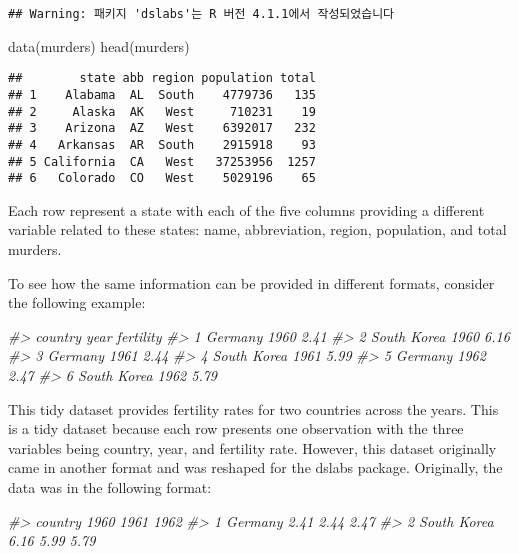 \documentclass[
]{article}
\newenvironment{Shaded}{\begin{snugshade}}{\end{snugshade}}
\newcommand{\CommentTok}[1]{\textcolor[rgb]{0.56,0.35,0.01}{\textit{#1}}}
\newcommand{\FunctionTok}[1]{\textcolor[rgb]{0.00,0.00,0.00}{#1}}
\newcommand{\NormalTok}[1]{#1}
\begin{document}
\begin{verbatim}
## Warning: 패키지 'dslabs'는 R 버전 4.1.1에서 작성되었습니다
\end{verbatim}

\begin{Shaded}
\begin{Highlighting}[]
\FunctionTok{data}\NormalTok{(murders)}
\FunctionTok{head}\NormalTok{(murders)}
\end{Highlighting}
\end{Shaded}

\begin{verbatim}
##        state abb region population total
## 1    Alabama  AL  South    4779736   135
## 2     Alaska  AK   West     710231    19
## 3    Arizona  AZ   West    6392017   232
## 4   Arkansas  AR  South    2915918    93
## 5 California  CA   West   37253956  1257
## 6   Colorado  CO   West    5029196    65
\end{verbatim}

Each row represent a state with each of the five columns providing a
different variable related to these states: name, abbreviation, region,
population, and total murders.

To see how the same information can be provided in different formats,
consider the following example:

\begin{Shaded}
\begin{Highlighting}[]
\CommentTok{\#\textgreater{}       country year fertility}
\CommentTok{\#\textgreater{} 1     Germany 1960      2.41}
\CommentTok{\#\textgreater{} 2 South Korea 1960      6.16}
\CommentTok{\#\textgreater{} 3     Germany 1961      2.44}
\CommentTok{\#\textgreater{} 4 South Korea 1961      5.99}
\CommentTok{\#\textgreater{} 5     Germany 1962      2.47}
\CommentTok{\#\textgreater{} 6 South Korea 1962      5.79}
\end{Highlighting}
\end{Shaded}

This tidy dataset provides fertility rates for two countries across the
years. This is a tidy dataset because each row presents one observation
with the three variables being country, year, and fertility rate.
However, this dataset originally came in another format and was reshaped
for the dslabs package. Originally, the data was in the following
format:

\begin{Shaded}
\begin{Highlighting}[]
\CommentTok{\#\textgreater{}       country 1960 1961 1962}
\CommentTok{\#\textgreater{} 1     Germany 2.41 2.44 2.47}
\CommentTok{\#\textgreater{} 2 South Korea 6.16 5.99 5.79}
\end{Highlighting}
\end{Shaded}
\end{document}
